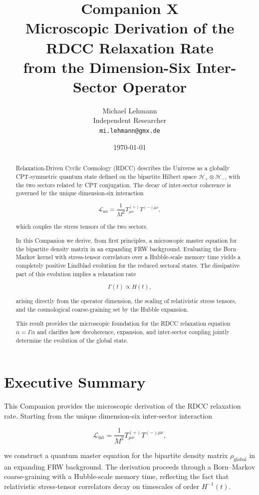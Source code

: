 \documentclass[11pt,a4paper]{article}
\title{%
  \textbf{Companion X}\\[8pt]
  {\Large Microscopic Derivation of the RDCC Relaxation Rate}\\[4pt]
  {\Large from the Dimension-Six Inter-Sector Operator}
}
\author{Michael Lehmann\\
Independent Researcher\\
\texttt{mi.lehmann@gmx.de}}
\date{\today}
\newcommand{\Hglobal}{\mathcal{H}_+ \otimes \mathcal{H}_-}
\newcommand{\rglobal}{\rho_{\mathrm{global}}}
\newcommand{\LintDef}{\mathcal{L}_{\mathrm{int}} = \frac{1}{M^2} T^{(+)}_{\mu\nu} T^{(-)\mu\nu}}
\newcommand{\RelaxEq}{\dot{\alpha} = \Gamma \alpha}
\begin{document}
\maketitle

\begin{abstract}
Relaxation-Driven Cyclic Cosmology (RDCC) describes the Universe as a globally
CPT-symmetric quantum state defined on the bipartite Hilbert space
\(\Hglobal\), with the two sectors related by CPT conjugation. The decay of
inter-sector coherence is governed by the unique dimension-six interaction


\[
\LintDef,
\]


which couples the stress tensors of the two sectors.

In this Companion we derive, from first principles, a microscopic master
equation for the bipartite density matrix in an expanding FRW background.  
Evaluating the Born--Markov kernel with stress-tensor correlators over a
Hubble-scale memory time yields a completely positive Lindblad evolution for
the reduced sectoral states. The dissipative part of this evolution implies a
relaxation rate


\[
\Gamma(t) \propto H(t),
\]


arising directly from the operator dimension, the scaling of relativistic
stress tensors, and the cosmological coarse-graining set by the Hubble
expansion.

This result provides the microscopic foundation for the RDCC relaxation
equation \(\RelaxEq\) and clarifies how decoherence, expansion, and inter-sector
coupling jointly determine the evolution of the global state.
\end{abstract}

\section*{Executive Summary}

This Companion provides the microscopic derivation of the RDCC relaxation rate.
Starting from the unique dimension-six inter-sector interaction


\[
\LintDef,
\]


we construct a quantum master equation for the bipartite density matrix
\(\rglobal\) in an expanding FRW background. The derivation proceeds through a
Born--Markov coarse-graining with a Hubble-scale memory time, reflecting the
fact that relativistic stress-tensor correlators decay on timescales of order
\(H^{-1}(t)\).
\end{document}
